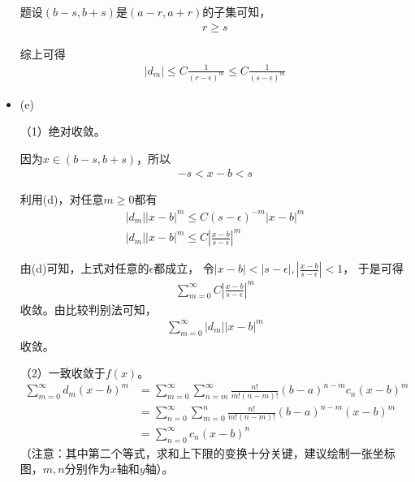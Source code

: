 \documentclass{article}
\begin{document}
\begin{itemize}
        题设$(b - s, b + s)$是$(a - r, a + r)$的子集可知，
        \begin{align*}
          r \geq s
        \end{align*}

        综上可得
        \begin{align*}
          |d_m| \leq C \frac{1}{(r - \epsilon)^{m}} \leq C \frac{1}{(s - \epsilon)^{m}}
        \end{align*}

  \item (e)

        （1）绝对收敛。

        因为$x \in (b - s, b + s)$，所以
        \begin{align*}
          -s < x - b < s
        \end{align*}

        利用(d)，对任意$m \geq 0$都有
        \begin{align*}
          |d_m||x - b|^m \leq C(s - \epsilon)^{-m} |x - b|^m \\
          |d_m||x - b|^m \leq C \left|\frac{x - b}{s - \epsilon}\right|^m
        \end{align*}

        由(d)可知，上式对任意的$\epsilon$都成立，
        令$|x - b| < |s - \epsilon|, \left|\frac{x - b}{s - \epsilon}\right| < 1$，
        于是可得
        \begin{align*}
          \sum \limits_{m = 0}^\infty C \left|\frac{x - b}{s - \epsilon}\right|^m
        \end{align*}
        收敛。由比较判别法可知，
        \begin{align*}
          \sum \limits_{m = 0}^\infty |d_m||x - b|^m
        \end{align*}
        收敛。

        （2）一致收敛于$f(x)$。
        \begin{align*}
          \sum \limits_{m = 0}^\infty d_m (x - b)^m
           & = \sum \limits_{m = 0}^\infty \sum \limits_{n = m}^\infty \frac{n!}{m!(n - m)!}(b - a)^{n - m}c_n(x - b)^m \\
           & = \sum \limits_{n = 0}^\infty \sum \limits_{m = 0}^n \frac{n!}{m!(n - m)!}(b - a)^{n - m}(x - b)^m         \\
           & = \sum \limits_{n = 0}^\infty c_n (x - b)^n
        \end{align*}
        （注意：其中第二个等式，求和上下限的变换十分关键，建议绘制一张坐标图，$m, n$分别作为$x$轴和$y$轴）。


\end{itemize}
\end{document}
